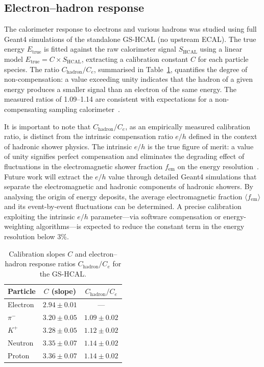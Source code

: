 \documentclass[preprint,12pt,times]{elsarticle}
\begin{document}
\subsection{Electron--hadron response}
\label{subsec:eresponse}

The calorimeter response to electrons and various hadrons was studied
using full Geant4 simulations of the standalone GS-HCAL (no upstream
ECAL).
The true energy $E_{\mathrm{true}}$ is fitted against the raw
calorimeter signal $S_{\mathrm{HCAL}}$ using a linear model
$E_{\mathrm{true}}=C\times S_{\mathrm{HCAL}}$, extracting a calibration
constant $C$ for each particle species.
The ratio $C_{\mathrm{hadron}}/C_{e}$, summarised in
Table~\ref{tab:eoverh_hcal}, quantifies the degree of non-compensation:
a value exceeding unity indicates that the hadron of a given energy
produces a smaller signal than an electron of the same energy.
The measured ratios of 1.09--1.14 are consistent with expectations for a
non-compensating sampling calorimeter~\cite{Akchurin:2012zz}.

It is important to note that $C_{\mathrm{hadron}}/C_{e}$, as an
empirically measured calibration ratio, is distinct from the intrinsic
compensation ratio $e/h$ defined in the context of hadronic shower
physics.
The intrinsic $e/h$ is the true figure of merit: a value of unity
signifies perfect compensation and eliminates the degrading effect of
fluctuations in the electromagnetic shower fraction $f_{\mathrm{em}}$
on the energy resolution~\cite{Akchurin:2012zz}.
Future work will extract the $e/h$ value through detailed Geant4
simulations that separate the electromagnetic and hadronic
components of hadronic showers.
By analysing the origin of energy deposits, the average electromagnetic
fraction $\langle f_{\mathrm{em}}\rangle$ and its event-by-event
fluctuations can be determined.
A precise calibration exploiting the intrinsic $e/h$ parameter---via
software compensation or energy-weighting algorithms---is expected to
reduce the constant term in the energy resolution below 3\%.

\begin{table}[htbp]
\centering
\caption{Calibration slopes $C$ and electron--hadron response ratios
$C_{\mathrm{hadron}}/C_{e}$ for the GS-HCAL\@.}
\label{tab:eoverh_hcal}
\begin{tabular}{lcc}
\toprule
Particle & $C$ (slope) & $C_{\mathrm{hadron}}/C_{e}$ \\
\midrule
Electron  & $2.94\pm0.01$ & ---            \\
$\pi^{-}$ & $3.20\pm0.05$ & $1.09\pm0.02$ \\
$K^{+}$   & $3.28\pm0.05$ & $1.12\pm0.02$ \\
Neutron   & $3.35\pm0.07$ & $1.14\pm0.02$ \\
Proton    & $3.36\pm0.07$ & $1.14\pm0.02$ \\
\bottomrule
\end{tabular}
\end{table}
\end{document}
